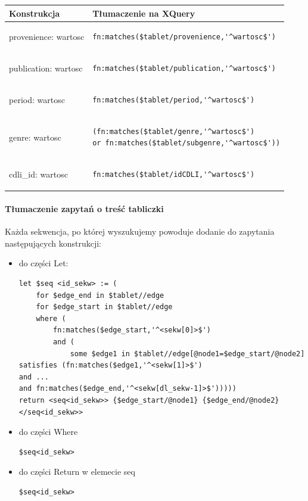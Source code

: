 \begin{longtable}{|p{2.5in}|p{3.5in}|}
\hline
{\bf Konstrukcja} & {\bf Tłumaczenie na XQuery}\\
\hline
\endhead
provenience: wartosc & \begin{verbatim}fn:matches($tablet/provenience,'^wartosc$')\end{verbatim}
\\
\hline
publication: wartosc & \begin{verbatim}fn:matches($tablet/publication,'^wartosc$')\end{verbatim}
\\
\hline
period: wartosc & \begin{verbatim}fn:matches($tablet/period,'^wartosc$')\end{verbatim}
\\
\hline
genre: wartosc & \begin{verbatim}(fn:matches($tablet/genre,'^wartosc$')
or fn:matches($tablet/subgenre,'^wartosc$'))\end{verbatim}
\\
\hline
cdli\_id: wartosc & \begin{verbatim}fn:matches($tablet/idCDLI,'^wartosc$')\end{verbatim}
\\
\hline
\end{longtable}


\paragraph{Tłumaczenie zapytań o treść tabliczki}
Każda sekwencja, po której wyszukujemy powoduje dodanie do zapytania następujących konstrukcji:
\begin{itemize}
\item{do części Let:}
\begin{verbatim}
let $seq <id_sekw> := (
	for $edge_end in $tablet//edge
	for $edge_start in $tablet//edge
	where (
		fn:matches($edge_start,'^<sekw[0]>$')
		and (
			some $edge1 in $tablet//edge[@node1=$edge_start/@node2]
satisfies (fn:matches($edge1,'^<sekw[1]>$')
and ... 
and fn:matches($edge_end,'^<sekw[dl_sekw-1]>$')))))
return <seq<id_sekw>> {$edge_start/@node1} {$edge_end/@node2} </seq<id_sekw>>
\end{verbatim}
\item{do części Where}
\begin{verbatim}
$seq<id_sekw>
\end{verbatim}
\item{do części Return w elemecie seq}
\begin{verbatim}
$seq<id_sekw>
\end{verbatim}
\end{itemize}





